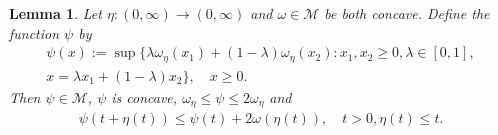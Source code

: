 \documentclass[10pt,a4paper]{amsart}
\newtheorem{lemma}[theorem]{Lemma}
\theoremstyle{definition}
\newcommand{\M}{\mathcal{M}}
\begin{document}
\begin{lemma}\label{le_envelope}
Let $ \eta:(0,\infty)\to(0,\infty) $ and $ \omega\in\M $ be both concave. Define the function $ \psi $ by
\begin{multline*}
\psi(x):=\sup\lbrace\lambda\omega_{\eta}(x_1)+(1-\lambda)\omega_{\eta}(x_2):x_1,x_2\geq 0,\lambda\in[0,1],\\
x=\lambda x_1+(1-\lambda)x_2\rbrace,\quad x\geq 0.
\end{multline*}
Then $ \psi\in\M $, $ \psi $ is concave, $ \omega_{\eta}\leq\psi\leq 2\omega_{\eta} $ and
\begin{align}\label{eq_envelope}
\psi(t+\eta(t))\leq\psi(t)+2\omega(\eta(t)),\quad t>0,\eta(t)\leq t.
\end{align}
\end{lemma}
\end{document}
